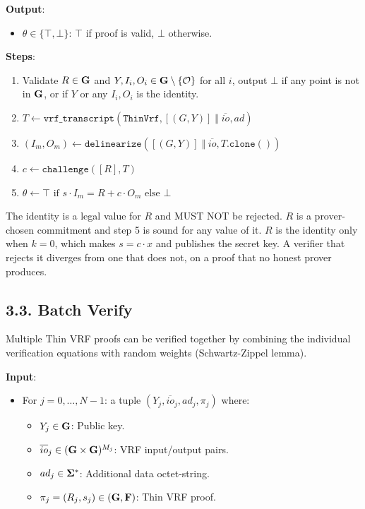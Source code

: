 \documentclass[
]{article}
\providecommand{\tightlist}{%
  \setlength{\itemsep}{0pt}\setlength{\parskip}{0pt}}
\begin{document}
\textbf{Output}:

\begin{itemize}
\tightlist
\item
  \(\theta \in \{ \top, \bot \}\): \(\top\) if proof is valid, \(\bot\)
  otherwise.
\end{itemize}

\textbf{Steps}:

\begin{enumerate}
\def\labelenumi{\arabic{enumi}.}
\tightlist
\item
  Validate \(R \in \bold{G}\) and
  \(Y, I_i, O_i \in \bold{G}\setminus \{\mathcal{O}\}\) for all \(i\),
  output \(\bot\) if any point is not in \(\bold{G}\), or if \(Y\) or
  any \(I_i, O_i\) is the identity.
\item
  \(T \gets \texttt{vrf\_transcript}(\texttt{ThinVrf}, [(G, Y)] \;\Vert\; \overline{io}, ad)\)
\item
  \((I_m, O_m) \gets \texttt{delinearize}([(G, Y)] \;\Vert\; \overline{io}, T.\texttt{clone}())\)
\item
  \(c \gets \texttt{challenge}([R], T)\)
\item
  \(\theta \gets \top \text{ if } s \cdot I_m = R + c \cdot O_m \text{ else } \bot\)
\end{enumerate}

The identity is a legal value for \(R\) and MUST NOT be rejected. \(R\)
is a prover-chosen commitment and step 5 is sound for any value of it.
\(R\) is the identity only when \(k = 0\), which makes \(s = c \cdot x\)
and publishes the secret key. A verifier that rejects it diverges from
one that does not, on a proof that no honest prover produces.

\subsection{3.3. Batch Verify}\label{batch-verify}

Multiple Thin VRF proofs can be verified together by combining the
individual verification equations with random weights (Schwartz-Zippel
lemma).

\textbf{Input}:

\begin{itemize}
\tightlist
\item
  For \(j = 0, \ldots, N-1\): a tuple
  \((Y_j, \overline{io}_j, ad_j, \pi_j)\) where:

  \begin{itemize}
  \tightlist
  \item
    \(Y_j \in \bold{G}\): Public key.
  \item
    \(\overline{io}_j \in (\bold{G}\times \bold{G})^{M_j}\): VRF
    input/output pairs.
  \item
    \(ad_j \in \bold{\Sigma}^*\): Additional data octet-string.
  \item
    \(\pi_j = (R_j, s_j) \in (\bold{G}, \bold{F})\): Thin VRF proof.
  \end{itemize}
\end{itemize}
\end{document}
